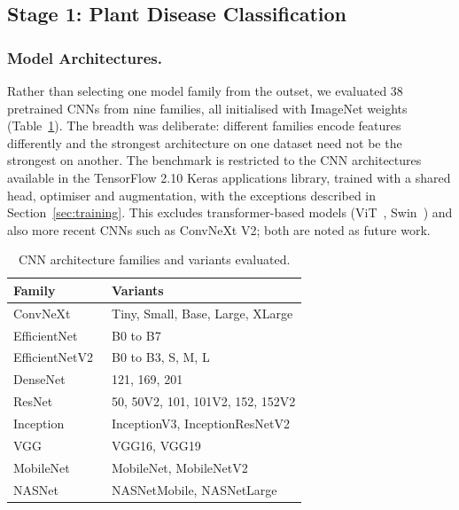 \subsection{Stage 1: Plant Disease Classification}

\subsubsection{Model Architectures.}
Rather than selecting one model family from the outset, we evaluated
38 pretrained CNNs from nine families, all initialised with ImageNet
weights (Table~\ref{tab:arch_families}).
The breadth was deliberate: different families encode features
differently and the strongest architecture on one dataset need not be
the strongest on another.
The benchmark is restricted to the CNN architectures available in the
TensorFlow 2.10 Keras applications library, trained with a shared head,
optimiser and augmentation, with the exceptions described in
Section~\ref{sec:training}. This excludes transformer-based models (ViT~\cite{dosovitskiy2021},
Swin~\cite{liu2021swin}) and also more recent CNNs such as ConvNeXt V2;
both are noted as future work.

\begin{table}[!htbp]
\centering
\caption{CNN architecture families and variants evaluated.}
\label{tab:arch_families}
\begin{tabular}{ll}
\toprule
\textbf{Family} & \textbf{Variants}\\
\midrule
ConvNeXt~\cite{convnext}             & Tiny, Small, Base, Large, XLarge\\
EfficientNet~\cite{efficientnet}     & B0 to B7\\
EfficientNetV2~\cite{efficientnetv2} & B0 to B3, S, M, L\\
DenseNet~\cite{densenet}             & 121, 169, 201\\
ResNet~\cite{resnet}                 & 50, 50V2, 101, 101V2, 152, 152V2\\
Inception~\cite{inception}           & InceptionV3, InceptionResNetV2\\
VGG~\cite{vgg}                       & VGG16, VGG19\\
MobileNet~\cite{mobilenet}           & MobileNet, MobileNetV2\\
NASNet~\cite{nasnet}                 & NASNetMobile, NASNetLarge\\
\bottomrule
\end{tabular}
\end{table}

